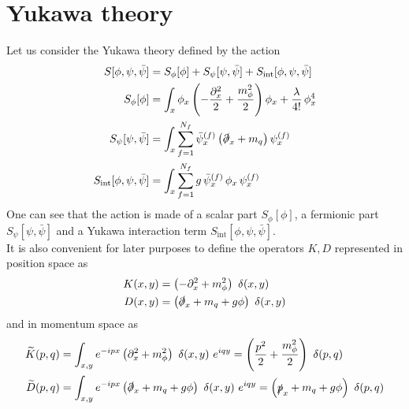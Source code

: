 \section{Yukawa theory}
\label{sec:Yukawa_theory}
Let us consider the Yukawa theory defined by the action
\begin{equation}
\begin{aligned}
    S[\phi,\psi,\bar\psi] &= S_\phi[\phi] + S_\psi[\psi, \bar\psi] + S_\text{int}[\phi, \psi, \bar\psi]\\
     S_\phi[\phi] &= \int_x \phi_x \left(-\frac{\partial^2_x}{2} + \frac{m_\phi^2}{2}\right) \phi_x + \frac{\lambda}{4!} \, \phi_x^4 \\
     S_\psi[\psi, \bar\psi] &= \int_x \sum_{f=1}^{N_f} \bar \psi_x^{(f)} \left(\slashed{\partial}_x + m_q \right) \psi_x^{(f)} \\
     S_\text{int}[\phi, \psi, \bar\psi] &= \int_x \sum_{f=1}^{N_f} g \, \bar \psi_x^{(f)} \, \phi_x \, \psi_x^{(f)}
    \label{eq:full_action_continuum}
\end{aligned}
\end{equation}
One can see that the action is made of a scalar part $S_\phi[\phi]$, a fermionic part $S_\psi[\psi, \bar\psi]$ and a Yukawa interaction term $S_\text{int}[\phi, \psi, \bar\psi]$. \\
It is also convenient for later purposes to define the operators $K, D$ represented in position space as 
\begin{equation}
    \begin{aligned}
        K(x, y) &=  \left(-\partial^2_x + m_\phi^2\right) \ \delta(x,y) \\
        D(x, y) &= \left(\slashed{\partial}_x + m_q + g\phi \right) \ \delta(x,y)
    \end{aligned}
    \label{eq:definition_kinetic_terms_continuum_position}
\end{equation}
and in momentum space as
\begin{equation}
    \begin{aligned}
        \widetilde{K}(p, q) &=  \int_{x,y} e^{-ipx} \left(\partial^2_x + m_\phi^2\right) \ \delta(x,y) \ e^{iqy} = \left(\frac{p^2}{2} + \frac{m_\phi^2}{2}\right) \ \delta(p,q) \\
        \widetilde{D}(p, q) &= \int_{x,y} e^{-ipx} \left(\slashed{\partial}_x + m_q + g\phi \right) \ \delta(x,y) \ e^{iqy} = \left(\slashed{p}_x + m_q + g\phi \right) \ \delta(p,q)
    \end{aligned}
    \label{eq:definition_kinetic_terms_continuum_momentum}
\end{equation}
